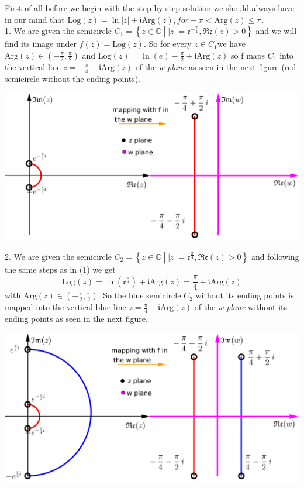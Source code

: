 \documentclass[11pt]{amsart}
\newcommand{\dsp}{\displaystyle}
\newcommand{\BBC}{\mathbb{C}}\newcommand{\mi}{\mathfrak{i}}
\begin{document}
First of all before we begin with the step by step solution we should always have in our mind that $\dsp\textrm{Log}(z)=\ln|z|+\mi 
\textrm{Arg}(z), for -\pi<\textrm{Arg}(z)\leq \pi$.\\
1. We are given the semicircle $\dsp 
C_{1}=\left\{z\in\BBC\;\left|\;|z|=\mathfrak{e}^{-\frac{\pi}{4}},\mathfrak{Re}
(z)>0\right.\right\}$ and we 
will find its image under $\dsp f(z)=\textrm{Log}(z)$. So for every $z\in C_{1}$we have 
$\dsp \textrm{Arg}(z)\in\left(-\frac{\pi}{2},\frac{\pi}{2}\right)$ and $\text{Log}(z)=\ln(e)-\frac{\pi}{2}+\mi\textrm{Arg}(z)$ so f maps $C_1$ 
into the vertical line $z=-\frac{\pi}{4}+\mi\textrm{Arg}(z)$  of the \textit{w-plane} as seen in the next figure (red semicircle without 
the ending points).
\begin{center}
\includegraphics{2a.png}
\end{center}
2. We are given the semicircle $\dsp 
C_{2}=\left\{z\in\BBC\;\left|\;|z|=\mathfrak{e}^{\frac{\pi}{4}},\mathfrak{Re}
(z)>0\right.\right\}$ and 
following the same steps as in (1) we get \[\textrm{Log}(z)=\ln\left(\mathfrak{e}^{\frac{\pi}{4}}\right)+\mi\textrm{Arg}(z)=
\frac{\pi}{4}+\mi\textrm{Arg}(z)\] with $\textrm{Arg}(z)\in\left(-\frac{\pi}{2},\frac{\pi}{2}\right)$. So the blue semicircle $C_2$ without its 
ending points is mapped into the vertical blue line $\dsp z=\frac{\pi}{4}+\mi\textrm{Arg}(z)$ of the \textit{w-plane} without its ending 
points as seen in the next figure.
\begin{center}
\includegraphics{2b.png}
\end{center}
\end{document}
